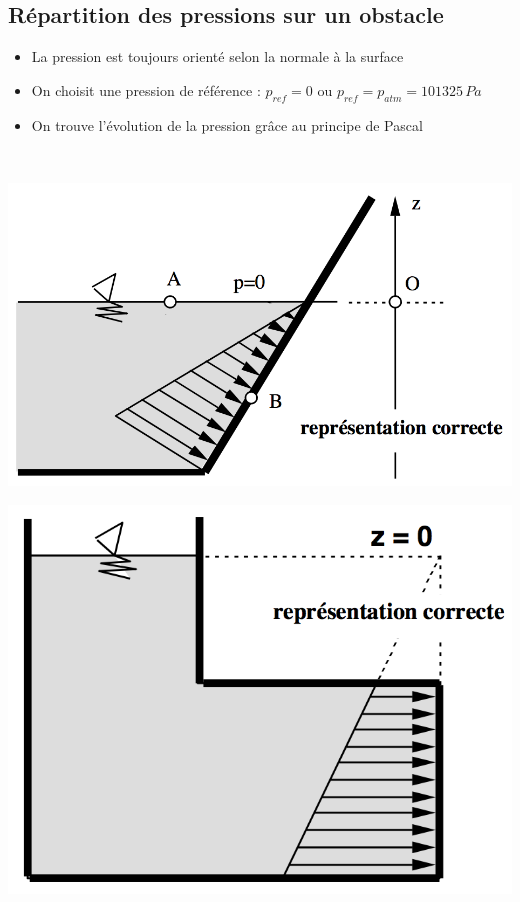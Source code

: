 \subsection*{Répartition des pressions sur un obstacle}
\begin{itemize}
	\item La pression est toujours orienté selon la normale à la surface
	\item On choisit une pression de référence : $p_{ref} = 0$ ou $p_{ref} = p_{atm} = 101325 \, Pa$
	\item On trouve l'évolution de la pression grâce au principe de Pascal
\end{itemize}
\ \\
\begin{minipage}{0.55 \textwidth}
	\begin{flushleft}
		\includegraphics[scale=0.5]{tp4-1}
	\end{flushleft}
\end{minipage}
\begin{minipage}{0.5 \textwidth}
	\begin{flushleft}
		\includegraphics[scale=0.5]{tp4-2}
	\end{flushleft}
\end{minipage}